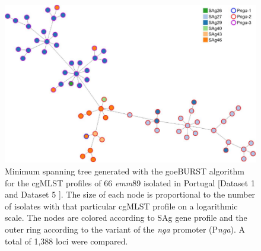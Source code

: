 \newpage
\begin{figure}[h!]
    \centering
    \includegraphics[angle=0,width=\textwidth]{figures/chapter 4/FigureS17.pdf}
    \caption[Minimum spanning tree generated with the goeBURST algorithm for the cgMLST profiles of 66 \textit{emm}89 isolated in Portugal.]{Minimum spanning tree generated with the goeBURST algorithm for the \ac{cgMLST} profiles of 66 \textit{emm}89 isolated in Portugal [Dataset 1 and Dataset 5 \cite{friaes_supplemental_2023}]. The size of each node is proportional to the number of isolates with that particular \ac{cgMLST} profile on a logarithmic scale. The nodes are colored according to SAg gene profile and the outer ring according to the variant of the \textit{nga} promoter (P\textit{nga}). A total of 1,388 loci were compared.}
    \label{fig:chap4_figureS17}
\end{figure}

